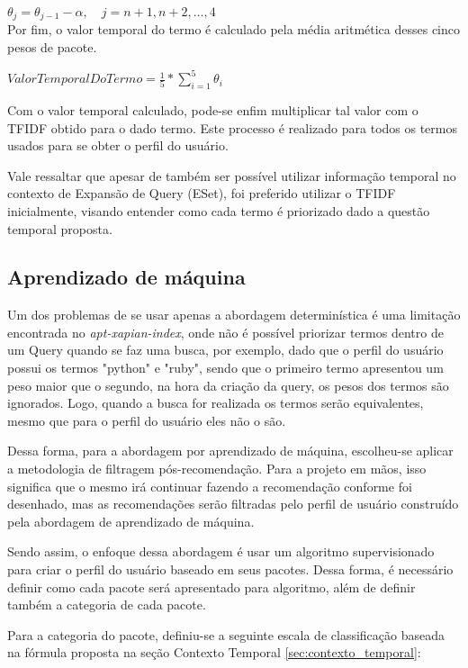 $\theta_j = \theta_{j-1} - \alpha , \quad j = n+1, n+2, ..., 4$
\\

Por fim, o valor temporal do termo é calculado pela média aritmética desses
cinco pesos de pacote.

$ValorTemporalDoTermo = \frac{1}{5} * \sum\limits_{i=1}^{5} \theta_i$

Com o valor temporal calculado, pode-se enfim multiplicar tal valor com o TFIDF
obtido para o dado termo. Este processo é realizado para todos os termos usados
para se obter o perfil do usuário.

Vale ressaltar que apesar de também ser possível utilizar informação temporal
no contexto de Expansão de Query (ESet), foi preferido utilizar o TFIDF inicialmente, visando entender
como cada termo é priorizado dado a questão temporal proposta.

\subsection{Aprendizado de máquina}

Um dos problemas de se usar apenas a abordagem determinística é uma limitação
encontrada no \textit{apt-xapian-index}, onde não é possível priorizar termos
dentro de um Query quando se faz uma busca, por exemplo, dado que o perfil
do usuário possui os termos "python" e "ruby", sendo que o primeiro termo
apresentou um peso maior que o segundo, na hora da criação da query, os pesos
dos termos são ignorados. Logo, quando a busca for realizada os termos serão
equivalentes, mesmo que para o perfil do usuário eles não o são.

Dessa forma, para a abordagem por aprendizado de máquina, escolheu-se aplicar a
metodologia de filtragem pós-recomendação. Para a projeto em mãos, isso
significa que o mesmo irá continuar fazendo a recomendação conforme foi
desenhado, mas as recomendações serão filtradas pelo perfil de usuário
construído pela abordagem de aprendizado de máquina.

Sendo assim, o enfoque dessa abordagem é usar um algoritmo supervisionado
para criar o perfil do usuário baseado em seus pacotes. Dessa forma, é
necessário definir como cada pacote será apresentado para algoritmo, além de
definir também a categoria de cada pacote.

Para a categoria do pacote, definiu-se a seguinte escala de classificação baseada na
fórmula proposta na seção Contexto Temporal \ref{sec:contexto_temporal}:

